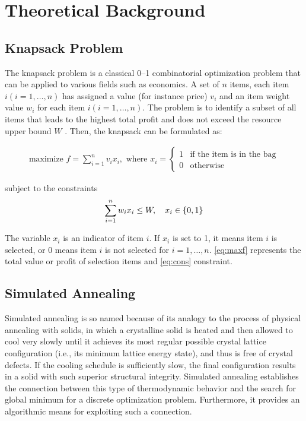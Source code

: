 \section{Theoretical Background}

\subsection{Knapsack Problem}
The knapsack problem is a classical 0--1 combinatorial optimization problem that can be applied to various fields such as economics. A set of $n$ items, each item $i (i = 1, \dots , n)$ has assigned a value (for instance price) $v_i$ and an item weight value $w_i$ for each item $i (i = 1, \dots , n)$. The problem is to identify a subset of all items that leads to the highest total profit and does not exceed the resource upper bound $W$ . Then, the knapsack can be formulated as:

\begin{align}\label{eq:maxf}
    \text{maximize }  f = \sum_{i=1}^{n} v_i x_i, \text{ where } x_i = 
    \begin{cases}
        1 & \text{if the item is in the bag} \\
        0 & \text{otherwise}
    \end{cases}
\end{align}

subject to the constraints
\begin{align}\label{eq:cons}
    \sum_{i=1}^{n} w_i x_i \leq W 
    \qc x_i \in \qty{0,1}
\end{align}

The variable $x_i$ is an indicator of item $i$. If $x_i$ is set to \num{1}, it means item $i$ is selected, or \num{0} means item $i$ is not selected for $i = 1, \dots , n$. \eqref{eq:maxf} represents the total value or profit of selection items and \eqref{eq:cons} constraint.

\subsection{Simulated Annealing}\label{sec:sa}
Simulated annealing is so named because of its analogy to the process of physical annealing with solids, in which a crystalline solid is heated and then allowed to cool very slowly until it achieves its most regular possible crystal lattice configuration (i.e., its minimum lattice energy state), and thus is free of crystal defects. If the cooling schedule is sufficiently slow, the final configuration results in a solid with such superior structural integrity. Simulated annealing establishes the connection between this type of thermodynamic behavior and the search for global minimum for a discrete optimization problem. Furthermore, it provides an algorithmic means for exploiting such a connection.

